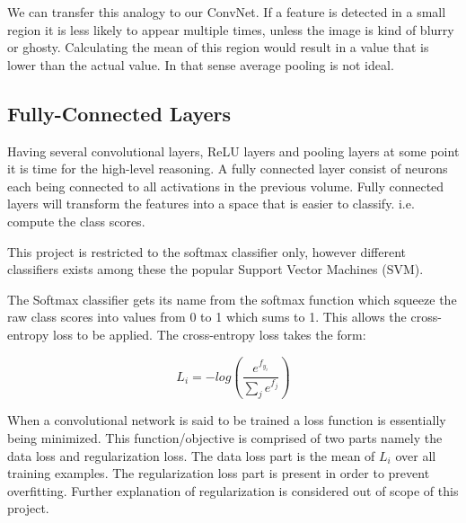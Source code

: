 We can transfer this analogy to our ConvNet. If a feature is detected in a small region it is less likely to appear multiple times, unless the image is kind of blurry or ghosty. Calculating the mean of this region would result in a value that is lower than the actual value. In that sense average pooling is not ideal.

\subsection{Fully-Connected Layers} %
\label{sub:fc_layers}

Having several convolutional layers, ReLU layers and pooling layers at some
point it is time for the high-level reasoning. A fully connected layer consist of neurons each being connected to all activations in the previous volume. Fully connected layers will transform the features into a space that is easier to classify. i.e. compute the class scores.

This project is restricted to the softmax classifier only, however different classifiers exists among these the popular Support Vector Machines (SVM).

The Softmax classifier gets its name from the softmax function which squeeze the raw class scores into values from 0 to 1 which sums to 1. This allows the cross-entropy loss to be applied. The cross-entropy loss takes the form:

$$ L_i = -log\left(\frac{e^{f_{y_i}}}{\sum_{j}{e^{f_j}}}\right)$$

When a convolutional network is said to be trained a loss function is essentially being minimized. This function/objective is comprised of two parts namely the data loss and regularization loss. The data loss part is the mean of $L_i$ over all training examples. The regularization loss part is present in order to prevent overfitting. Further explanation of regularization is considered out of scope of this project.


